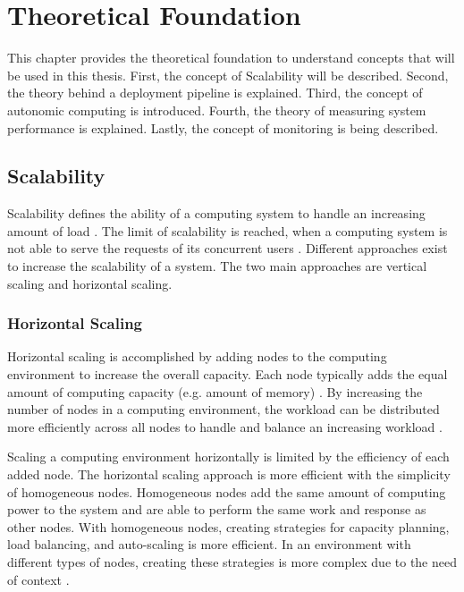 \chapter{Theoretical Foundation}
\label{chap:02_foundation}


This chapter provides the theoretical foundation to understand concepts that will be used in this thesis. First, the concept of Scalability will be described. Second, the theory behind a deployment pipeline is explained. Third, the concept of autonomic computing is  introduced. Fourth, the theory of measuring system performance is explained. Lastly, the concept of monitoring is being described.


\section{Scalability}
\label{sec:02_foundations_scalability}
Scalability defines the ability of a computing system to handle an increasing amount of load \cite{Farcic2017Toolkit21}. 
The limit of scalability is reached, when a computing system is not able to serve the requests of its concurrent users \cite{Wilder2012CloudPatterns}.
Different approaches exist to increase the scalability of a system. The two main approaches are vertical scaling and horizontal scaling.


\subsection{Horizontal Scaling}
\label{subsec:02_foundations_scalability_horizontal-scaling}
Horizontal scaling is accomplished by adding nodes to the computing environment to increase the overall capacity.
Each node typically adds the equal amount of computing capacity (e.g. amount of memory) \cite{Wilder2012CloudPatterns}.
By increasing the number of nodes in a computing environment, the workload can be distributed more efficiently across all nodes to handle and balance an increasing workload \cite{Wilder2012CloudPatterns, Abbott2015ScalabilityArt}.


Scaling a computing environment horizontally is limited by the efficiency of each added node.
The horizontal scaling approach is more efficient with the simplicity of homogeneous nodes.
Homogeneous nodes add the same amount of computing power to the system and are able to perform the same work and response as other nodes.
With homogeneous nodes, creating strategies for capacity planning, load balancing, and auto-scaling is more efficient.
In an environment with different types of nodes, creating these strategies is more complex due to the need of context \cite{Wilder2012CloudPatterns}.


